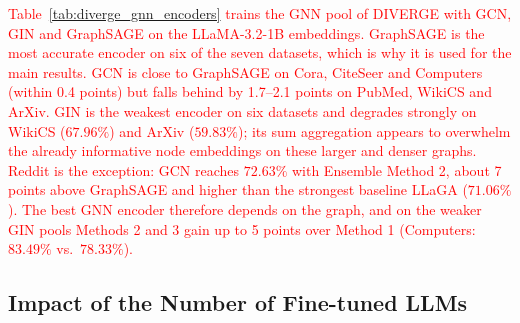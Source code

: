 \documentclass[a4paper,fleqn]{cas-sc}
\newcommand{\revone}[1]{\textcolor{red}{#1}}   %
\begin{document}
\revone{Table~\ref{tab:diverge_gnn_encoders} trains the GNN pool of DIVERGE with GCN, GIN and GraphSAGE on the LLaMA-3.2-1B embeddings. GraphSAGE is the most accurate encoder on six of the seven datasets, which is why it is used for the main results. GCN is close to GraphSAGE on Cora, CiteSeer and Computers (within 0.4 points) but falls behind by 1.7--2.1 points on PubMed, WikiCS and ArXiv. GIN is the weakest encoder on six datasets and degrades strongly on WikiCS ($67.96\%$) and ArXiv ($59.83\%$); its sum aggregation appears to overwhelm the already informative node embeddings on these larger and denser graphs. Reddit is the exception: GCN reaches $72.63\%$ with Ensemble Method 2, about 7 points above GraphSAGE and higher than the strongest baseline LLaGA ($71.06\%$). The best GNN encoder therefore depends on the graph, and on the weaker GIN pools Methods 2 and 3 gain up to 5 points over Method 1 (Computers: $83.49\%$ vs.\ $78.33\%$).}

\subsection{Impact of the Number of Fine-tuned LLMs}
\end{document}
